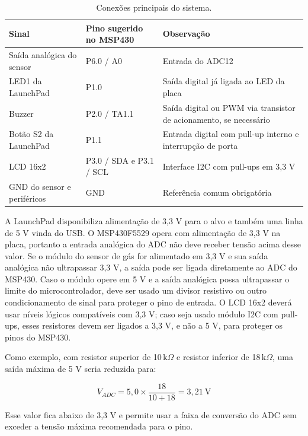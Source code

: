 \documentclass[11pt,a4paper]{article}
\numberwithin{equation}{section}
\begin{document}
\begin{table}[htbp]
  \centering
  \small
  \begin{tabular}{@{}p{4.4cm}p{3.4cm}p{6.2cm}@{}}
    \toprule
    \textbf{Sinal} & \textbf{Pino sugerido no MSP430} & \textbf{Observação} \\
    \midrule
    Saída analógica do sensor & P6.0 / A0 & Entrada do ADC12 \\
    \addlinespace
    LED1 da LaunchPad & P1.0 & Saída digital já ligada ao LED da placa \\
    \addlinespace
    Buzzer & P2.0 / TA1.1 & Saída digital ou PWM via transistor de acionamento, se necessário \\
    \addlinespace
    Botão S2 da LaunchPad & P1.1 & Entrada digital com pull-up interno e interrupção de porta \\
    \addlinespace
    LCD 16x2 & P3.0 / SDA e P3.1 / SCL & Interface I2C com pull-ups em 3,3 V \\
    \addlinespace
    GND do sensor e periféricos & GND & Referência comum obrigatória \\
    \bottomrule
  \end{tabular}
  \caption{Conexões principais do sistema.}
  \label{tab:conexoes}
\end{table}

A LaunchPad disponibiliza alimentação de 3,3 V para o alvo e também uma linha de 5 V vinda do USB. O
MSP430F5529 opera com alimentação de 3,3 V na placa, portanto a entrada analógica do ADC não deve
receber tensão acima desse valor. Se o módulo do sensor de gás for alimentado em 3,3 V e sua saída
analógica não ultrapassar 3,3 V, a saída pode ser ligada diretamente ao ADC do MSP430. Caso o módulo
opere em 5 V e a saída analógica possa ultrapassar o limite do microcontrolador, deve ser usado um
divisor resistivo ou outro condicionamento de sinal para proteger o pino de entrada. O LCD 16x2 deverá
usar níveis lógicos compatíveis com 3,3 V; caso seja usado módulo I2C com pull-ups, esses resistores
devem ser ligados a 3,3 V, e não a 5 V, para proteger os pinos do MSP430.

Como exemplo, com resistor superior de 10\,k$\Omega$ e resistor inferior de 18\,k$\Omega$, uma saída
máxima de 5 V seria reduzida para:

\begin{equation}
  V_{ADC} = 5{,}0 \times \frac{18}{10 + 18} = 3{,}21\ \text{V}
  \label{eq:divisor}
\end{equation}

Esse valor fica abaixo de 3,3 V e permite usar a faixa de conversão do ADC sem exceder a tensão máxima
recomendada para o pino.
\end{document}
